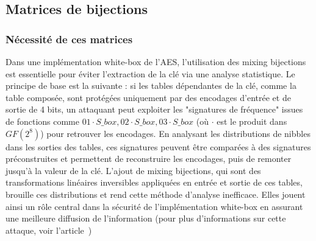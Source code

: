 \documentclass[a4paper, 10pt]{article}
\begin{document}
\subsection{Matrices de bijections}
\subsubsection{Nécessité de ces matrices}
Dans une implémentation white-box de l’AES, l’utilisation des mixing bijections est essentielle pour éviter 
l’extraction de la clé via une analyse statistique. Le principe de base est la suivante : si les tables dépendantes de la 
clé, comme la table composée, sont 
protégées uniquement par des encodages d’entrée et de sortie de 4 bits, un attaquant peut exploiter les "signatures de 
fréquence" issues de fonctions comme $01 \cdot S\_box, 02 \cdot S\_box, 03 \cdot S\_box$ (où $\cdot$ est le produit dans $GF(2^{8})$) 
pour retrouver les encodages. En 
analysant les distributions de nibbles dans les sorties des tables, ces signatures peuvent être comparées à des signatures 
préconstruites et permettent de reconstruire les encodages, puis de remonter jusqu’à la valeur de la clé. L’ajout de mixing 
bijections, qui sont des transformations linéaires inversibles appliquées en entrée et sortie de ces tables, brouille 
ces distributions et rend cette méthode d’analyse inefficace. Elles jouent ainsi un rôle central dans la sécurité de 
l’implémentation white-box en assurant une meilleure diffusion de l’information (pour plus d'informations sur cette attaque, voir l'article~\cite{key1})
\end{document}
